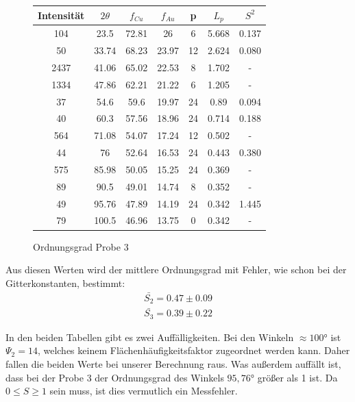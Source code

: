                 \begin{figure}[H]
                    \centering
                    \begin{tabular}{c | c | c | c | c | c | c}
                        Intensität & $2\theta$ & $f_{Cu}$ & $f_{Au}$ & p & $L_p$ & $S^2$\\
                        \hline
                        104 & 23.5 & 72.81 & 26 & 6 & 5.668 & 0.137\\
                        50 & 33.74 & 68.23 & 23.97 & 12 & 2.624 & 0.080\\
                        2437 & 41.06 & 65.02 & 22.53 & 8 & 1.702 & - \\
                        1334 & 47.86 & 62.21 & 21.22 & 6 & 1.205 & - \\
                        37 & 54.6 & 59.6 & 19.97 & 24 & 0.89 & 0.094\\
                        40 & 60.3 & 57.56 & 18.96 & 24 & 0.714 & 0.188\\
                        564 & 71.08 & 54.07 & 17.24 & 12 & 0.502 & - \\
                        44 & 76 & 52.64 & 16.53 & 24 & 0.443 & 0.380\\
                        575 & 85.98 & 50.05 & 15.25 & 24 & 0.369 &  -\\
                        89 & 90.5 & 49.01 & 14.74 & 8 & 0.352 &  -\\
                        49 & 95.76 & 47.89 & 14.19 & 24 & 0.342 & 1.445\\
                        79 & 100.5 & 46.96 & 13.75 & 0 & 0.342 & - \\
                    \end{tabular}
                    \caption{Ordnungsgrad Probe 3}
                \end{figure}

                Aus diesen Werten wird der mittlere Ordnungsgrad mit Fehler, wie schon bei der Gitterkonstanten, 
                bestimmt:
                \begin{align}
                    \bar{S_2} = 0.47 \pm 0.09\\
                    \bar{S_3} = 0.39 \pm 0.22
                \end{align}

                In den beiden Tabellen gibt es zwei Auffälligkeiten. Bei den Winkeln $\approx 100$°
                ist $\Psi_2 = 14$, welches keinem Flächenhäufigkeitsfaktor zugeordnet werden kann. Daher fallen
                die beiden Werte bei unserer Berechnung raus. Was außerdem auffällt ist, dass bei der Probe 3 
                der Ordnungsgrad des Winkels $95,76$° größer als 1 ist. Da $0 \leq S \geq 1$ sein muss, ist dies 
                vermutlich ein Messfehler.
            


